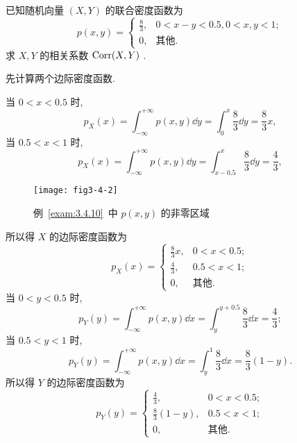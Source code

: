 	\begin{example}\label{exam:3.4.10}
		已知随机向量 $(X,Y)$ 的联合密度函数为
		\begin{equation*}
			p(x,y)=\begin{cases}
				\frac{8}{3}, & 0<x-y<0.5,0<x,y<1;\\
				0, & \text{其他}.
			\end{cases}
		\end{equation*}
		求 $X,Y$ 的相关系数 $\operatorname{Corr}(X,Y)$ .
		\begin{solution}
			先计算两个边际密度函数.

			当 $0<x<0.5$ 时,
			\begin{equation*}
				p_{X}(x)=\int_{-\infty}^{+\infty}p(x,y)\dd y=\int_{0}^{x}\frac{8}{3}\dd y=\frac{8}{3}x,
			\end{equation*}
			当 $0.5<x<1$ 时,
			\begin{equation*}
				p_{X}(x)=\int_{-\infty}^{+\infty}p(x,y)\dd y=\int_{x-0.5}^{x}\frac{8}{3}\dd y=\frac{4}{3},
			\end{equation*}
			\begin{figure}[htbp]
				\centering
				\texttt{[image: fig3-4-2]}
				\caption{例~\ref{exam:3.4.10}~中 $p(x,y)$ 的非零区域}\label{fig:3.4.2}
			\end{figure}
			所以得 $X$ 的边际密度函数为
			\begin{equation*}
				p_{X}(x)=\begin{cases}
					\frac{8}{3}x, & 0<x<0.5;\\
					\frac{4}{3}, & 0.5<x<1;\\
					0, & \text{其他}.
				\end{cases}
			\end{equation*}
			当 $0<y<0.5$ 时,
			\begin{equation*}
				p_{Y}(y)=\int_{-\infty}^{+\infty} p(x, y) \dd x=\int_{y}^{y+0.5} \frac{8}{3} \dd x=\frac{4}{3};
			\end{equation*}
			当 $0.5<y<1$ 时,
			\begin{equation*}
				p_{Y}(y)=\int_{-\infty}^{+\infty} p(x, y) \dd x=\int_{y}^{1} \frac{8}{3} \dd x=\frac{8}{3}(1-y).
			\end{equation*}
			所以得 $Y$ 的边际密度函数为
			\begin{equation*}
				p_{Y}(y)=\begin{cases}
					\frac{4}{3}, & 0<x<0.5;\\
					\frac{8}{3}(1-y), & 0.5<x<1;\\
					0, & \text{其他}.
				\end{cases}

\end{equation*}
\end{solution}
\end{example}
